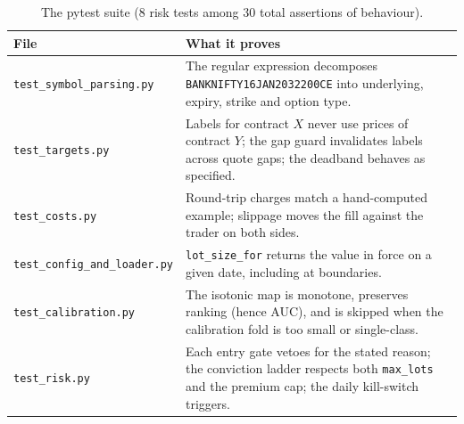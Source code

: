 \documentclass[11pt,a4paper]{article}
\newcommand{\code}[1]{\texttt{#1}}
\begin{document}
\begin{table}[H]
\centering\small
\begin{tabular}{@{}lp{9.2cm}@{}}
\toprule
\textbf{File} & \textbf{What it proves}\\
\midrule
\code{test\_symbol\_parsing.py} & The regular expression decomposes
\code{BANKNIFTY16JAN2032200CE} into underlying, expiry, strike and option type.\\
\code{test\_targets.py} & Labels for contract $X$ never use prices of contract $Y$; the
gap guard invalidates labels across quote gaps; the deadband behaves as specified.\\
\code{test\_costs.py} & Round-trip charges match a hand-computed example; slippage moves
the fill against the trader on both sides.\\
\code{test\_config\_and\_loader.py} & \code{lot\_size\_for} returns the value in force on
a given date, including at boundaries.\\
\code{test\_calibration.py} & The isotonic map is monotone, preserves ranking (hence
AUC), and is skipped when the calibration fold is too small or single-class.\\
\code{test\_risk.py} & Each entry gate vetoes for the stated reason; the conviction
ladder respects both \code{max\_lots} and the premium cap; the daily kill-switch
triggers.\\
\bottomrule
\end{tabular}
\caption{The pytest suite (8 risk tests among 30 total assertions of behaviour).}
\end{table}
\end{document}
